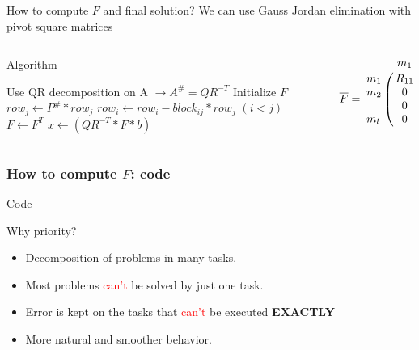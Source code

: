 \documentclass[11pt]{beamer}
\begin{document}
\begin{frame}{How to compute $F$ and final solution?}
We can use Gauss Jordan elimination with pivot square matrices
\begin{columns}
\begin{column}{.5\textwidth}
\begin{block}{Algorithm}
\begin{algorithmic}[1]
\State Use QR decomposition on A $\rightarrow A^{\#} = QR^{-T}$ 
\State Initialize $F$
\State $row_j \gets P^{\#}*row_j$
\State $row_i \gets row_i - block_{ij}*row_j$ $(i < j)$
\EndFor
\State $F \gets F^T$
\State $x \gets (QR^{-T}*F*b)$
\end{algorithmic}
\end{block}
\end{column}
\begin{column}{.5\textwidth}
\[
\overline{F} = \bordermatrix{
~& m_1 & m_2 & & m_l\cr
m_1 & R_{11} & \star & \dots & \star \cr
m_2 & 0 & R_{22} & \dots & \star \cr
~ & 0 & 0 & \dots & \star \cr
m_l & 0 & 0 & \dots & R_{ll}
}
\]
\end{column}
\end{columns}
\end{frame}

\begin{frame}[fragile]
\frametitle{How to compute $F$: code}
\begin{block}{Code}
\begin{adjustbox}{width=\textwidth , height=.2\textwidth}

\end{adjustbox}
\end{block}
\end{frame}

\begin{frame}{Why priority?}
\begin{itemize}
\item Decomposition of problems in many tasks.
\item Most problems \textcolor{red}{can't} be solved by just one task.
\item Error is kept on the tasks that \textcolor{red}{can't} be executed	\textbf{EXACTLY} 
\item More natural and smoother behavior.
\end{itemize}
\end{frame}
\end{document}
